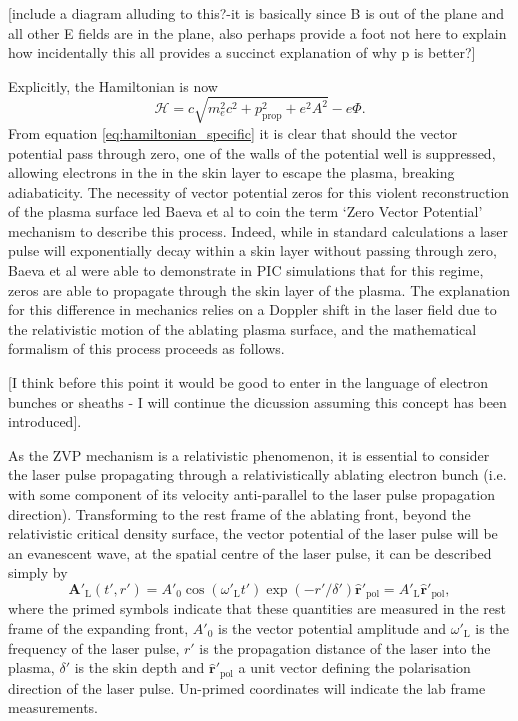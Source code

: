 [include a diagram alluding to this?-it is basically since B is out of the plane and all other E fields are in the plane, also perhaps provide a foot not here to explain how incidentally this all provides a succinct explanation of why p is better?]

Explicitly, the Hamiltonian is now
\begin{equation}\label{eq:hamiltonian_specific}
	\mathcal{H} = c\sqrt{m^2_ec^2 + p^2_\mathrm{prop} + e^2A^2} - e\Phi.
\end{equation}
From equation \ref{eq:hamiltonian_specific} it is clear that should the vector potential pass through zero, one of the walls of the potential well is suppressed, allowing electrons in the in the skin layer to escape the plasma, breaking adiabaticity. The necessity of vector potential zeros for this violent reconstruction of the plasma surface led Baeva et al \cite{baeva2011ZeroVectorPotential} to coin the term `Zero Vector Potential' mechanism to describe this process. Indeed, while in standard calculations a laser pulse will exponentially decay within a skin layer without passing through zero, Baeva et al \cite{baeva2011ZeroVectorPotential} were able to demonstrate in \ac{PIC} simulations that for this regime, zeros are able to propagate through the skin layer of the plasma. The explanation for this difference in mechanics relies on a Doppler shift in the laser field due to the relativistic motion of the ablating plasma surface, and the mathematical formalism of this process proceeds as follows.

[I think before this point it would be good to enter in the language of electron bunches or sheaths - I will continue the dicussion assuming this concept has been introduced].

As the \ac{ZVP} mechanism is a relativistic phenomenon, it is essential to consider the laser pulse propagating through a relativistically ablating electron bunch (i.e. with some component of its velocity anti-parallel to the laser pulse propagation direction). Transforming to the rest frame of the ablating front, beyond the relativistic critical density surface, the vector potential of the laser pulse will be an evanescent wave, at the spatial centre of the laser pulse, it can be described simply by
\begin{equation}
	\mathbf{A}'_\mathrm{L}(t',r') = A'_0\cos(\omega'_\mathrm{L}t')\exp(-r'/\delta')\hat{\mathbf{r}}'_\mathrm{pol}= A'_\mathrm{L}\hat{\mathbf{r}}'_\mathrm{pol},
\end{equation}
where the primed symbols indicate that these quantities are measured in the rest frame of the expanding front, $A'_0$ is the vector potential amplitude and $\omega'_\mathrm{L}$ is the frequency of the laser pulse, $r'$ is the propagation distance of the laser into the plasma, $\delta'$ is the skin depth and $\hat{\mathbf{r}}'_\mathrm{pol}$ a unit vector defining the polarisation direction of the laser pulse. Un-primed coordinates will indicate the lab frame measurements.

